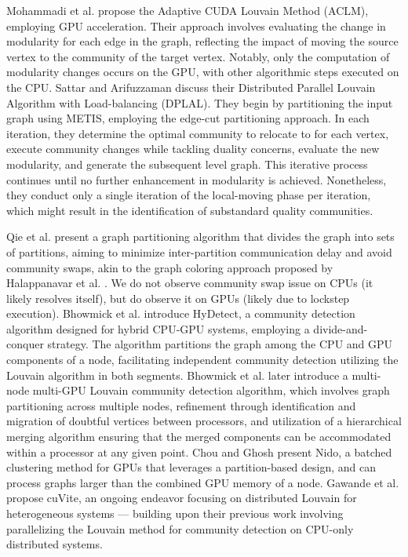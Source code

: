 
Mohammadi et al. \cite{com-mohammadi20} propose the Adaptive CUDA Louvain Method (ACLM), employing GPU acceleration. Their approach involves evaluating the change in modularity for each edge in the graph, reflecting the impact of moving the source vertex to the community of the target vertex. Notably, only the computation of modularity changes occurs on the GPU, with other algorithmic steps executed on the CPU. Sattar and Arifuzzaman \cite{sattar2022scalable} discuss their Distributed Parallel Louvain Algorithm with Load-balancing (DPLAL). They begin by partitioning the input graph using METIS, employing the edge-cut partitioning approach. In each iteration, they determine the optimal community to relocate to for each vertex, execute community changes while tackling duality concerns, evaluate the new modularity, and generate the subsequent level graph. This iterative process continues until no further enhancement in modularity is achieved. Nonetheless, they conduct only a single iteration of the local-moving phase per iteration, which might result in the identification of substandard quality communities. Qie et al. \cite{qie2022isolate} present a graph partitioning algorithm that divides the graph into sets of partitions, aiming to minimize inter-partition communication delay and avoid community swaps, akin to the graph coloring approach proposed by Halappanavar et al. \cite{com-halappanavar17}. We do not observe community swap issue on CPUs (it likely resolves itself), but do observe it on GPUs (likely due to lockstep execution). Bhowmick et al. \cite{com-bhowmik19} introduce HyDetect, a community detection algorithm designed for hybrid CPU-GPU systems, employing a divide-and-conquer strategy. The algorithm partitions the graph among the CPU and GPU components of a node, facilitating independent community detection utilizing the Louvain algorithm in both segments. Bhowmick et al. \cite{com-bhowmick22} later introduce a multi-node multi-GPU Louvain community detection algorithm, which involves graph partitioning across multiple nodes, refinement through identification and migration of doubtful vertices between processors, and utilization of a hierarchical merging algorithm ensuring that the merged components can be accommodated within a processor at any given point. Chou and Ghosh \cite{chou2022batched} present Nido, a batched clustering method for GPUs that leverages a partition-based design, and can process graphs larger than the combined GPU memory of a node. Gawande et al. \cite{com-gawande22} propose cuVite, an ongoing endeavor focusing on distributed Louvain for heterogeneous systems --- building upon their previous work involving parallelizing the Louvain method for community detection on CPU-only distributed systems.
